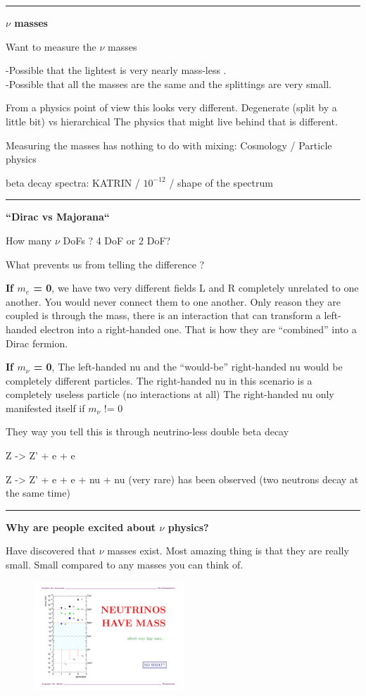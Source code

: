 {\noindent\rule{\textwidth}{1pt}

\textbf{$\nu$ masses}

Want to measure the $\nu$ masses

-Possible that the lightest is very nearly mass-less . \\
-Possible that all the masses are the same and the splittings are very small.

From a physics point of view this looks very different.
\bc
 Degenerate (split by a little bit)  vs  hierarchical 
\ec
The physics that might live behind that is different.

Measuring the masses has nothing to do with mixing: Cosmology / Particle physics 
 
beta decay spectra: KATRIN /  $10^{-12}$ / shape of the spectrum

\noindent\rule{\textwidth}{1pt}

\textbf{``Dirac vs Majorana``} 

How many $\nu$ DoFs ?  4 DoF  or 2 DoF? 

What prevents us from telling the difference ?

\textbf{If $m_e$ = 0}, we have two very different fields L and R completely unrelated to one another.
You would never connect them to one another. 
Only reason they are coupled is through the mass, there is an interaction that can transform a left-handed electron into a right-handed one.
That is how they are ``combined'' into a Dirac fermion.

\textbf{If $m_\nu$ = 0},
The left-handed nu and the ``would-be'' right-handed nu would be completely different particles. 
The right-handed nu in this scenario is a completely useless particle (no interactions at all)
The right-handed nu only manifested itself if $m_\nu$ != 0

They way you tell this is through neutrino-less double beta decay

 Z -> Z' + e + e 

 Z -> Z' + e + e  + nu + nu (very rare) has been observed (two neutrons decay at the same time) 


\noindent\rule{\textwidth}{1pt} 

\textbf{Why are people excited about $\nu$ physics? }

Have discovered that $\nu$ masses exist. 
Most amazing thing is that they are really small. 
Small compared to any masses you can think of. 

\begin{figure}[h!]
\centering
\includegraphics[width=0.5\textwidth]{./NuMass2.pdf}
\end{figure}


}

